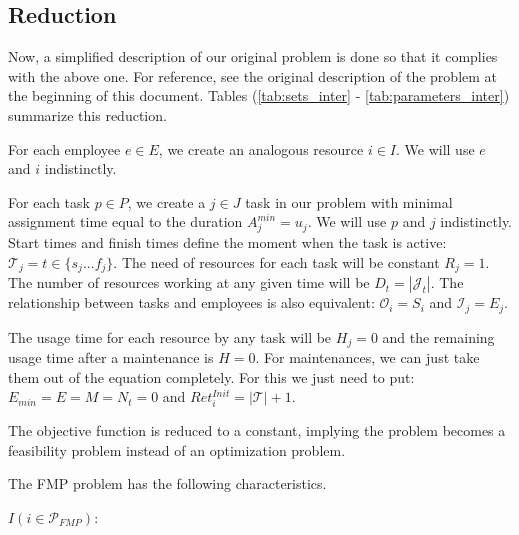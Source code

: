 \documentclass[a4paper,11pt]{article}
\begin{document}
    \subsection{Reduction}

    Now, a simplified description of our original problem is done so that it complies with the above one. For reference, see the original description of the problem at the beginning of this document. Tables (\ref{tab:sets_inter} - \ref{tab:parameters_inter}) summarize this reduction.

    For each employee $e \in E$, we create an analogous resource $i \in I$. We will use $e$ and $i$ indistinctly.

    For each task $p \in P$, we create a $j \in J$ task in our problem with minimal assignment time equal to the duration $A^{min}_j = u_j$. We will use $p$ and $j$ indistinctly.
    Start times and finish times define the moment when the task is active: $\mathcal{T}_j = t \in \{s_j ... f_j\}$. The need of resources for each task will be constant $R_{j} = 1$. The number of resources working at any given time will be $D_t = |\mathcal{J}_t|$. The relationship between tasks and employees is also equivalent: $\mathcal{O}_i = S_i$ and $\mathcal{I}_j = E_j$.

    The usage time for each resource by any task will be $H_j = 0$ and the remaining usage time after a maintenance is $H = 0$.
    For maintenances, we can just take them out of the equation completely. For this we just need to put: $E_{min} = E = M = N_t = 0$ and $Ret^{Init}_{i} = |\mathcal{T}| + 1$.

    The objective function is reduced to a constant, implying the problem becomes a feasibility problem instead of an optimization problem.

    The FMP problem has the following characteristics.

    $I(i \in \mathcal{P}_{FMP})$:

    \vskip 0.3cm

\end{document}
